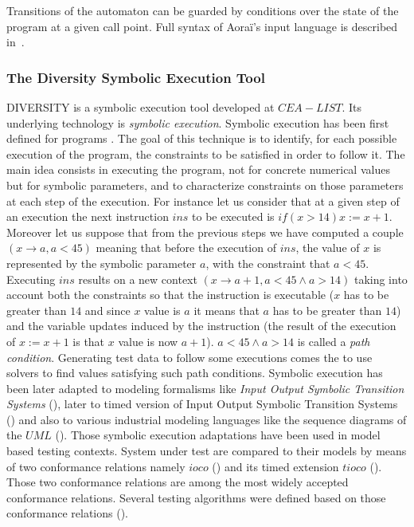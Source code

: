 \documentclass{template/openetcs_report}
\begin{document}
Transitions of the automaton can be guarded by conditions over the state of the
program at a given call point. Full syntax of Aoraï's input language is 
described in~\cite{aorai}.




\subsubsection{The Diversity Symbolic Execution Tool}


DIVERSITY is a symbolic execution tool developed at $CEA-LIST$. Its underlying technology is {\em symbolic execution}.  Symbolic execution has been first defined for programs \cite{King75,Clarke,Rama}. The goal of this technique is to identify, for each possible execution of the program, the constraints to be satisfied in order to follow it.  
The main idea consists in executing the program, not for concrete numerical values but for symbolic parameters, and to characterize constraints on those parameters at each step of the execution. 
For instance let us consider that at a given step of an execution the next instruction $ins$ to be executed is $if(x>14) x:=x+1$. Moreover let us suppose that from the previous steps we have computed a couple $(x\rightarrow a, a<45)$ meaning that before the execution of $ins$, the  value of $x$ is represented by the symbolic parameter $a$, with the constraint that $a<45$. Executing $ins$ results on a new context $(x\rightarrow a+1 , a<45 \land a>14)$ taking into account both the constraints so that the instruction is executable ($x$ has to be greater than $14$ and since $x$ value is $a$ it means that $a$ has to be greater than $14$) and the variable updates induced by the instruction (the result of the execution of $x:=x+1$ is that $x$ value is now $a+1$). $a<45 \land a>14$ is called a {\em path
  condition}. Generating test data to follow some executions comes the to use solvers to find values satisfying such path conditions. 
Symbolic execution has been later adapted to modeling formalisms like {\em Input Output Symbolic Transition Systems} (\cite{RGLG03,GAL00}), later to timed version of Input Output Symbolic Transition Systems (\cite{EGL11,BEGL12}) and also to various industrial modeling languages like the {sequence diagrams} of the $UML$ (\cite{BGS11}). Those symbolic execution adaptations have been used in model based testing contexts. System under test are compared to their models by means of two conformance relations namely {\em $ioco$} (\cite{Tre96a}) and its timed extension {\em $tioco$} (\cite{Kri04}). Those two conformance relations are among the most widely accepted conformance relations. Several testing algorithms were defined based on those conformance relations (\cite{GLRT06, EGL11, BEGL12}).
\end{document}
